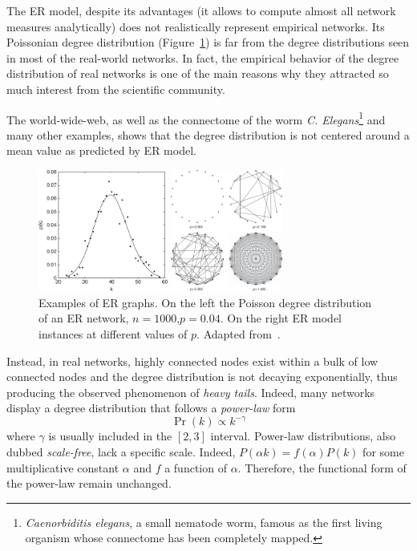 The ER model, despite its advantages (it allows to compute almost all network measures analytically) does not realistically represent empirical networks. Its Poissonian degree distribution (Figure~\ref{fig:deg_dist_poisson_er}) is far from the degree distributions seen in most of the real-world networks. In fact, the empirical behavior of the degree distribution of real networks is one of the main reasons why they attracted so much interest from the scientific community.

The world-wide-web, as well as the connectome of the worm \emph{C. Elegans}\footnote{\emph{Caenorbiditis elegans}, a small nematode worm, famous as the first living organism whose connectome has been completely mapped.} and many other examples, shows that the degree distribution is not centered around a mean value as predicted by ER model. 

\begin{figure}
\centering
\begin{minipage}[b]{0.5\textwidth}
\includegraphics[height=4cm]{images/deg_dist_poisson_er.pdf}
\end{minipage}\noindent
\begin{minipage}[b]{0.5\textwidth}
\includegraphics[height=4cm]{images/er_graphs.pdf}
\end{minipage}
\caption{Examples of ER graphs. On the left the Poisson degree distribution of an ER network, $n=1000$,$p=0.04$. On the right ER model instances at different values of $p$. Adapted from~\cite{Estrada2011}.}
\label{fig:deg_dist_poisson_er}
\end{figure}

Instead, in real networks, highly connected nodes exist within a bulk of low connected nodes and the degree distribution is not decaying exponentially, thus producing the observed phenomenon of \emph{heavy tails}. Indeed, many networks display a degree distribution that follows a \emph{power-law} form
\begin{equation}
\Pr(k) \propto k^{-\gamma}
\end{equation}
where $\gamma$ is usually included in the $[2,3]$ interval.
Power-law distributions, also dubbed \emph{scale-free}, lack a specific scale. Indeed, $P(\alpha k)=f(\alpha)P(k)$ for some multiplicative constant $\alpha$  and $f$ a function of $\alpha$. Therefore, the functional form of the power-law remain unchanged.

